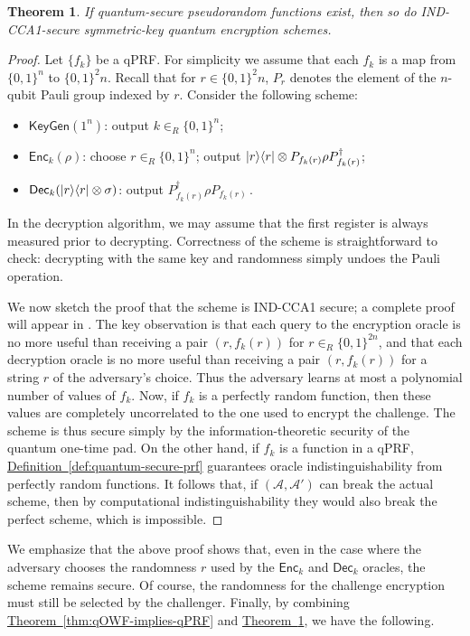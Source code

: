 \documentclass[11pt]{article}
\numberwithin{equation}{section}
\newtheorem{theorem}{Theorem}
\newcommand{\expref}[2]{\texorpdfstring{\hyperref[#2]{#1~\ref{#2}}}{#1~\ref{#2}}}
\newcommand{\algo}{\mathcal}
\newcommand{\KeyGen}{\ensuremath{\mathsf{KeyGen}}\xspace}
\newcommand{\Enc}{\ensuremath{\mathsf{Enc}}\xspace}
\newcommand{\Dec}{\ensuremath{\mathsf{Dec}}\xspace}
\newcommand{\inrand}{\in_R}
\begin{document}
\begin{theorem}\label{thm:IND-CCA1}
If quantum-secure pseudorandom functions exist, then so do IND-CCA1-secure symmetric-key quantum encryption schemes.
\end{theorem}
\begin{proof}
Let $\{f_k\}$ be a qPRF. For simplicity we assume that each $f_k$ is a map from $\{0, 1\}^n$ to $\{0, 1\}^2n$. Recall that for $r \in \{0, 1\}^2n$, $P_r$ denotes the element of the $n$-qubit Pauli group indexed by $r$. Consider the following scheme:
\begin{itemize}
\item $\KeyGen(1^n)$: output $k \inrand \{0, 1\}^n$;
\item $\Enc_k(\rho)$: choose $r \inrand \{0, 1\}^n$; output ${\left\vert{r}\right\rangle}{\left\langle{r}\right\vert} \otimes P_{f_k(r)} \rho P_{f_k(r)}^{\dagger}$;
\item $\Dec_k(\ket{r}\bra{r} \otimes \sigma)$: output  $P_{f_k(r)}^\dagger \rho P_{f_k(r)}$\,.
\end{itemize}
In the decryption algorithm, we may assume that the first register is always measured prior to decrypting. Correctness of the scheme is straightforward to check: decrypting with the same key and randomness simply undoes the Pauli operation.

We now sketch the proof that the scheme is IND-CCA1 secure; a complete proof will appear in \cite{ABGFSS15}. The key observation is that each query to the encryption oracle is no more useful than receiving a pair $(r, f_k(r))$ for $r \inrand \{0, 1\}^{2n}$, and that each decryption oracle is no more useful than receiving a pair $(r, f_k(r))$ for a string $r$ of the adversary's choice. Thus the adversary learns at most a polynomial number of values of $f_k$. Now, if $f_k$ is a perfectly random function, then these values are completely uncorrelated to the one used to encrypt the challenge. The scheme is thus secure simply by the information-theoretic security of the quantum one-time pad. On the other hand, if $f_k$ is a function in a qPRF, \expref{Definition}{def:quantum-secure-prf} guarantees oracle indistinguishability from perfectly random functions. It follows that, if $(\algo A, \algo A')$ can break the actual scheme, then by computational indistinguishability they would also break the perfect scheme, which is impossible.
\end{proof}

We emphasize that the above proof shows that, even in the case where the adversary chooses the randomness $r$ used by the $\Enc_k$ and $\Dec_k$ oracles, the scheme remains secure. Of course, the randomness for the challenge encryption must still be selected by the challenger. Finally, by combining \expref{Theorem}{thm:qOWF-implies-qPRF} and \expref{Theorem}{thm:IND-CCA1}, we have the following.
\end{document}
